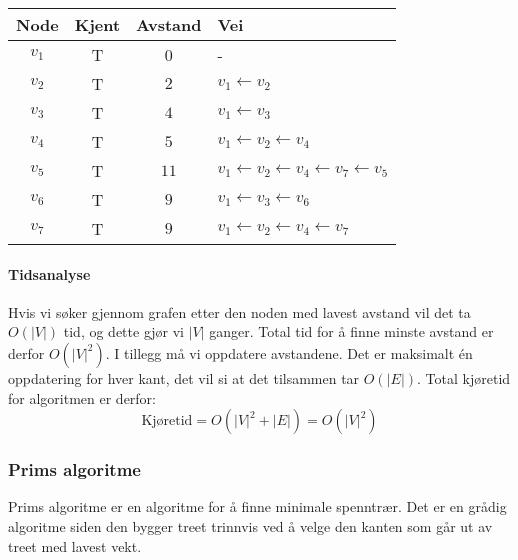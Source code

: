 \begin{example}
\begin{center}
\begin{tabular}{c | c | c | l}
	 Node   & Kjent & Avstand & Vei                                                                 \\ \hline
	$ v_1 $ & T     & 0       & -                                                                   \\
	$ v_2 $ & T     & $ 2 $   & $ v_1 \leftarrow v_2 $                                              \\
	$ v_3 $ & T     & $ 4 $   & $ v_1 \leftarrow v_3 $                                              \\
	$ v_4 $ & T     & $ 5 $   & $ v_1 \leftarrow v_2 \leftarrow v_4 $                               \\
	$ v_5 $ & T     & $ 11 $  & $ v_1 \leftarrow v_2 \leftarrow v_4 \leftarrow v_7 \leftarrow v_5 $ \\
	$ v_6 $ & T     & $ 9 $   & $ v_1 \leftarrow v_3 \leftarrow v_6 $                               \\
	$ v_7 $ & T     & $ 9 $   & $ v_1 \leftarrow v_2 \leftarrow v_4 \leftarrow v_7 $
\end{tabular}
\end{center}
\end{example}

\paragraph{Tidsanalyse}
Hvis vi søker gjennom grafen etter den noden med lavest avstand vil det ta $ O(|V|) $ tid, og dette gjør vi $ |V| $ ganger. Total tid for å finne minste avstand er derfor $ O(|V|^2) $. I tillegg må vi oppdatere avstandene. Det er maksimalt én oppdatering for hver kant, det vil si at det tilsammen tar $ O(|E|) $. Total kjøretid for algoritmen er derfor:
\[ \text{Kjøretid} = O\left(|V|^2 + |E|\right) = O\left(|V|^2\right) \]

\subsubsection{Prims algoritme}
\label{prim}

Prims algoritme er en algoritme for å finne minimale spenntrær. Det er en grådig algoritme siden den bygger treet trinnvis ved å velge den kanten som går ut av treet med lavest vekt. 

